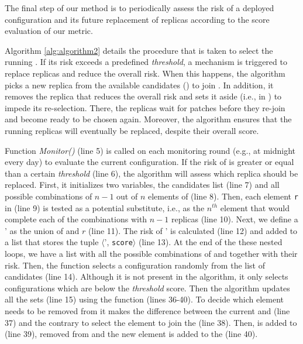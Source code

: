 The final step of our method is to periodically assess the risk of a deployed configuration and its future replacement of replicas according to the score evaluation of our metric.


Algorithm \ref{alg:algorithm2} details the procedure that is taken to select the running \ES.
If its risk exceeds a predefined \emph{threshold}, a mechanism is triggered to replace replicas and reduce the overall risk.
When this happens, the algorithm picks a new replica from the available candidates (\RS) to join \ES. 
In addition, it removes the replica that reduces the overall risk and sets it aside (i.e., in \QS) to impede its re-selection.
There, the replicas wait for patches before they re-join \RS and become ready to be chosen again.
Moreover, the algorithm ensures that the running replicas will eventually be replaced, despite their overall score.


Function \emph{Monitor()} (line 5) is called on each monitoring round (e.g., at midnight every day) to evaluate the current configuration.
If the risk of \ES is greater or equal than a certain \emph{threshold} (line 6), the algorithm will assess which replica should be replaced.
First, it initializes two variables, the candidates list (line 7) and all possible combinations of $n-1$ out of $n$ elements of \ES (line 8).
Then, each element \texttt{r} in \RS (line 9) is tested as a potential substitute, i.e., as the $n^{th}$ element that would complete each of the combinations \COMB with $n-1$ replicas (line 10).
Next, we define a \ES' as the union of \COMB and $r$ (line 11).
The risk of \ES' is calculated (line 12) and added to a list that stores the tuple $\langle$\ES', \texttt{score}$\rangle$ (line 13). 
At the end of the these nested loops, we have a list with all the possible combinations of \ES and \RS together with their risk.
Then, the function \Rand selects a configuration randomly from the list of candidates (line 14). 
Although it is not present in the algorithm, it only selects configurations which are below the \emph{threshold} score. 
Then the algorithm updates all the sets (line 15) using the function \Replace (lines 36-40). 
To decide which element needs to be removed from \ES it makes the difference between the current \ES and \SC (line 37) and the contrary to select the element to join the \ES (line 38).
Then, \toRemove is added to \QS (line 39), removed from \ES and the new element is added to the \ES (line 40).
 

